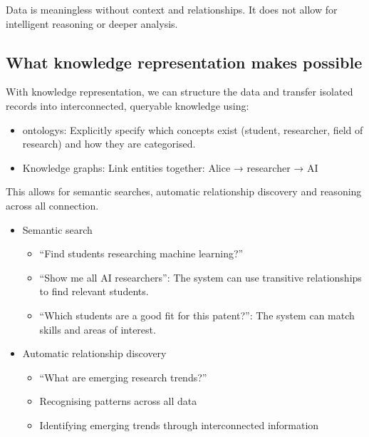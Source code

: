 Data is meaningless without context and relationships.
It does not allow for intelligent reasoning or deeper analysis.

\subsection*{What knowledge representation makes possible}

With knowledge representation, we can structure the data and transfer isolated records into interconnected,
queryable knowledge using:
\begin{itemize}
    \item \glspl{ontology}: Explicitly specify which concepts exist (student, researcher, field of research)
    and how they are categorised.
    \item Knowledge graphs: Link entities together: Alice → researcher → AI
\end{itemize}

This allows for semantic searches, automatic relationship discovery and reasoning across all connection.


\begin{bsp}
    \begin{itemize}
        \item Semantic search
        \begin{itemize}
            \item ``Find students researching machine learning?''
            \item ``Show me all AI researchers'': The system can use transitive relationships to find relevant students.
            \item ``Which students are a good fit for this patent?'': The system can match skills and areas of interest.
        \end{itemize}
        \item Automatic relationship discovery
        \begin{itemize}
            \item ``What are emerging research trends?''
            \item Recognising patterns across all data
            \item Identifying emerging trends through interconnected information
        \end{itemize}
    \end{itemize}

\end{bsp}

